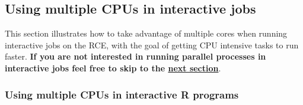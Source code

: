 \documentclass[11pt]{article}
\begin{document}
\subsection{Using multiple CPUs in interactive jobs}
\label{sec:orgd1025e7}
This section illustrates how to take advantage of multiple cores when running interactive jobs on the RCE, with the goal of getting CPU intensive tasks to run faster. \textbf{If you are not interested in running parallel processes in interactive jobs feel free to skip to the \hyperref[sec:org4d3b0d6]{next section}}.

\subsubsection{Using multiple CPUs in interactive R programs}
\label{sec:org24e6108}
\end{document}
